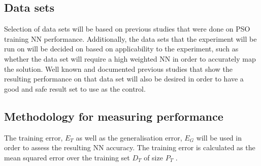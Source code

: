 \documentclass[conference]{IEEEtran}
\begin{document}
	\subsection{Data sets}
	Selection of data sets will be based on previous studies that were done on \ac{PSO} training \ac{NN} performance. Additionally, the data sets that the experiment will be run on will be decided on based on applicability to the experiment, such as whether the data set will require a high weighted \ac{NN} in order to accurately map the solution. Well known and documented previous studies that show the resulting performance on that data set will also be desired in order to have a good and safe result set to use as the control.

	\subsection{Methodology for measuring performance}
	The training error, $E_T$ as well as the generalisation error, $E_G$ will be used in order to assess the resulting \ac{NN} accuracy. The training error is calculated as the mean squared error over the training set $D_T$ of size $P_T$ \cite{vanwyk:overfitting-psoffnn}.
\end{document}
